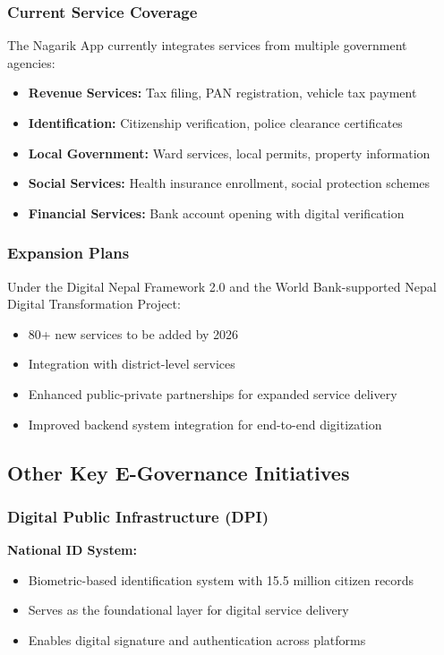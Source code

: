 \documentclass[12pt,a4paper]{article}
\begin{document}
\subsubsection{Current Service Coverage}

The Nagarik App currently integrates services from multiple government agencies:
\begin{itemize}
    \item \textbf{Revenue Services:} Tax filing, PAN registration, vehicle tax payment
    \item \textbf{Identification:} Citizenship verification, police clearance certificates
    \item \textbf{Local Government:} Ward services, local permits, property information
    \item \textbf{Social Services:} Health insurance enrollment, social protection schemes
    \item \textbf{Financial Services:} Bank account opening with digital verification
\end{itemize}

\subsubsection{Expansion Plans}

Under the Digital Nepal Framework 2.0 and the World Bank-supported Nepal Digital Transformation Project:
\begin{itemize}
    \item 80+ new services to be added by 2026
    \item Integration with district-level services
    \item Enhanced public-private partnerships for expanded service delivery
    \item Improved backend system integration for end-to-end digitization
\end{itemize}

\subsection{Other Key E-Governance Initiatives}

\subsubsection{Digital Public Infrastructure (DPI)}

\textbf{National ID System:}
\begin{itemize}
    \item Biometric-based identification system with 15.5 million citizen records
    \item Serves as the foundational layer for digital service delivery
    \item Enables digital signature and authentication across platforms
\end{itemize}
\end{document}
